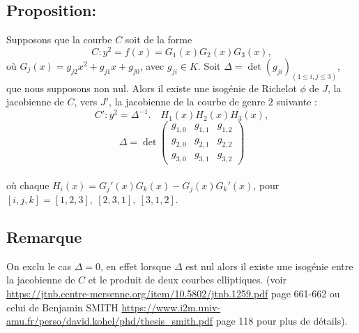 \documentclass[12pt,a4paper]{article}
\begin{document}
	\subsection{Proposition:}
		Supposons que la courbe $C$ soit de la forme
		\begin{equation}
			C : y^2 = f(x) = G_1(x)G_2(x)G_3(x),
		\end{equation}
		où $G_j(x) = g_{j2}x^2 + g_{j1}x + g_{j0}$, avec $g_{ji} \in K$. Soit $\Delta = \det(g_{ji})_{(1\leq i,j\leq 3)}$, que nous supposons non nul. Alors il existe une isogénie de Richelot $\phi$ de $J$, la jacobienne de $C$, vers $J'$, la jacobienne de la courbe de genre $2$ suivante :
		\begin{equation}
			C' :  y^2 = \Delta^{-1}.\quad H_1(x)H_2(x)H_3(x),
		\end{equation}
		\[\Delta = \det
		\begin{pmatrix}
			g_{1,0} & g_{1,1} & g_{1,2} \\
			g_{2,0} & g_{2,1} & g_{2,2} \\
			g_{3,0} & g_{3,1} & g_{3,2}
		\end{pmatrix}\]
		\\
		où chaque $H_i(x) = G_j'(x)G_k(x) - G_j(x)G_k'(x)$, pour $[i,j,k] = [1,2,3],\ [2,3,1],\ [3,1,2]$.
		
	\subsection{Remarque}
	On exclu le cas $\Delta = 0$, en effet lorsque $\Delta$ est nul alors il existe une isogénie entre la jacobienne de $C$ et le produit de deux courbes elliptiques. (voir \url{https://jtnb.centre-mersenne.org/item/10.5802/jtnb.1259.pdf} page 661-662 ou celui de Benjamin SMITH  \quad \url{https://www.i2m.univ-amu.fr/perso/david.kohel/phd/thesis_smith.pdf} page 118 pour plus de détails).\\
	
\end{document}
